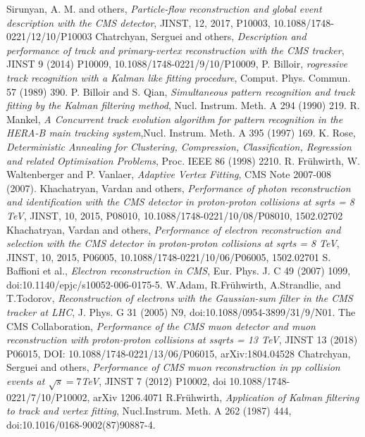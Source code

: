 \begin{thebibliography}{999}
		
		 Sirunyan, A. M. and others, \emph{Particle-flow reconstruction and global event description with the CMS detector}, JINST, 12, 2017, P10003, 10.1088/1748-0221/12/10/P10003 %
		 Chatrchyan, Serguei and others, \emph{Description and performance of track and primary-vertex reconstruction with the CMS tracker}, JINST 9 (2014) P10009,
		10.1088/1748-0221/9/10/P10009, 
		 P. Billoir,  \emph{rogressive track recognition with a Kalman like fitting procedure}, Comput. Phys. Commun. 57 (1989) 390.
		 P. Billoir and S. Qian, \emph{Simultaneous pattern recognition and track fitting by the Kalman filtering method}, Nucl. Instrum. Meth. A 294 (1990) 219.
		 R. Mankel, \emph{A Concurrent track evolution algorithm for pattern recognition in the HERA-B main tracking system},Nucl. Instrum. Meth. A 395 (1997) 169.
		 K. Rose, \emph{Deterministic Annealing for Clustering, Compression, Classification, Regression and related Optimisation Problems}, Proc. IEEE 86 (1998) 2210.
		 R. Fr\"uhwirth, W. Waltenberger and P. Vanlaer, \emph{Adaptive Vertex Fitting}, CMS Note 2007-008 (2007).
		 Khachatryan, Vardan and others, \emph{Performance of photon reconstruction and identification with the CMS detector in proton-proton collisions at sqrt{s} = 8 TeV}, JINST, 10,  2015, P08010, 10.1088/1748-0221/10/08/P08010, 1502.02702 
		 Khachatryan, Vardan and others, \emph{Performance of electron reconstruction and selection with the CMS detector in proton-proton collisions at sqrt{s} = 8 TeV}, JINST, 10, 2015, P06005, 10.1088/1748-0221/10/06/P06005, 1502.02701
		 S. Baffioni et al., \emph{Electron reconstruction in CMS}, Eur. Phys. J. C 49 (2007) 1099, doi:10.1140/epjc/s10052-006-0175-5.
		 W.Adam, R.Fr\"uhwirth, A.Strandlie, and T.Todorov, \emph{Reconstruction of electrons with the Gaussian-sum filter in the CMS tracker at LHC}, J. Phys. G 31 (2005) N9, doi:10.1088/0954-3899/31/9/N01.
		 The CMS Collaboration, \emph{Performance of the CMS muon detector and muon reconstruction with proton-proton collisions at ssqrt{s} = 13 TeV}, JINST 13 (2018) P06015, DOI: 10.1088/1748-0221/13/06/P06015,  	arXiv:1804.04528
		 Chatrchyan, Serguei and others, \emph{Performance of CMS muon reconstruction in $pp$ collision events at $\sqrt{s} = 7$TeV}, JINST 7 (2012) P10002, doi 10.1088/1748-0221/7/10/P10002, arXiv 1206.4071
		 R.Fr\" uhwirth, \emph{Application of Kalman filtering to track and vertex fitting}, Nucl.Instrum. Meth. A 262 (1987) 444, doi:10.1016/0168-9002(87)90887-4.

\end{thebibliography}
